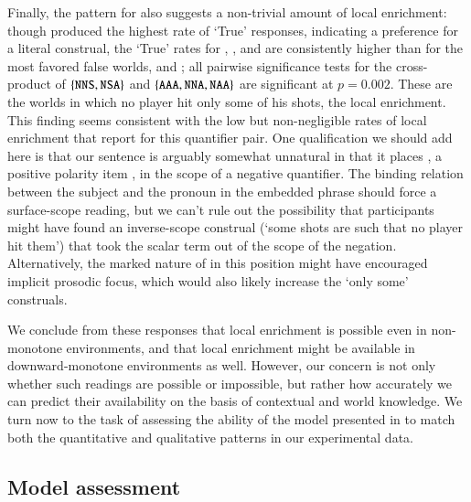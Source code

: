\documentclass[leqno,12pt]{article}
\begin{document}
Finally, the pattern for  also suggests a non-trivial
amount of local enrichment: though  produced the highest
rate of `True' responses, indicating a preference for a literal
construal, the `True' rates for , , and
 are consistently higher than for the most favored false
worlds,  and ; all pairwise significance tests
for the cross-product of $\left\{ \texttt{NNS}, \texttt{NSA} \right\}$ and
$\left\{ \texttt{AAA}, \texttt{NNA}, \texttt{NAA} \right\}$ are significant at
$p = 0.002$. These are the worlds in which no player hit only some of
his shots, the local enrichment. This finding seems consistent with
the low but non-negligible rates of local enrichment that
 report for this quantifier
pair. One qualification we should add here is that our sentence is
arguably somewhat unnatural in that it places , a positive
polarity item \citep{Baker70,Israel96}, in the scope of a negative
quantifier. The binding relation between the subject and the pronoun
 in the embedded phrase should force a surface-scope
reading, but we can't rule out the possibility that participants might
have found an inverse-scope construal (`some shots are such that no
player hit them') that took the scalar term out of the scope of the
negation. Alternatively, the marked nature of  in this
position might have encouraged implicit prosodic focus, which would
also likely increase the `only some' construals.

We conclude from these responses that local enrichment is possible
even in non-monotone environments, and that local enrichment might be
available in downward-monotone environments as well. However, our
concern is not only whether such readings are possible or impossible,
but rather how accurately we can predict their availability on the
basis of contextual and world knowledge.  We turn now to the task of
assessing the ability of the model presented in  to match both
the quantitative and qualitative patterns in our experimental data.


\subsection{Model assessment}\label{sec:binary:assess}
\end{document}
